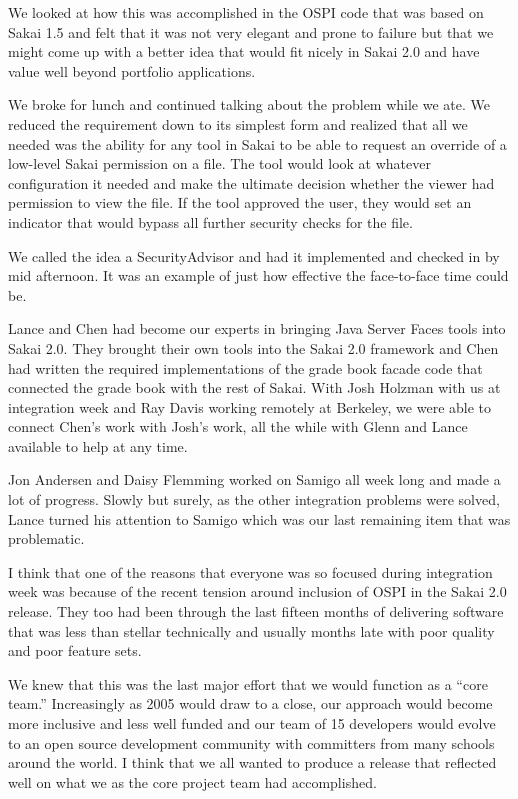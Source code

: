 \documentclass[12pt]{book}
\begin{document}
We looked at how this was accomplished in the OSPI code that
was based on Sakai 1.5 and felt that it was not very elegant
and prone to failure but that we might come up with a better
idea that would fit nicely in Sakai 2.0 and have value well
beyond portfolio applications.

We broke for lunch and continued talking about the problem
while we ate.  We reduced the requirement down to its simplest
form and realized that all we needed was the ability for any
tool in Sakai to be able to request an override
of a low-level Sakai permission on a file.  The tool would
look at whatever configuration it needed and make the
ultimate decision whether the viewer had permission to view
the file.   If the tool approved the user, they would set
an indicator that would bypass all further security checks
for the file.


We called the idea a SecurityAdvisor and had it
implemented and checked in by mid afternoon.  It was an
example of just how effective the face-to-face time could be.

Lance and Chen had become our experts in bringing Java
Server Faces tools into Sakai 2.0.   They brought their own tools
into the Sakai 2.0 framework and Chen had written the
required implementations of the grade book facade code that
connected the grade book with the rest of Sakai.
With Josh Holzman with us at integration week and Ray Davis
working remotely at Berkeley, we were able to connect
Chen's work with Josh's work, all the while with Glenn
and Lance available to help at any time.

Jon Andersen and Daisy Flemming worked on Samigo all week
long and made a lot of progress.  Slowly but surely, as the
other integration problems were solved, Lance turned his
attention to Samigo which was our last remaining item that
was problematic.

I think that one of the reasons that everyone was so
focused during integration week was because of
the recent tension around inclusion of OSPI in the
Sakai 2.0 release.
They too had been through the last fifteen months of
delivering software that was less than stellar technically
and usually months late with poor quality and poor feature
sets.

We knew that this was the last major effort that we would
function as a ``core team.''   Increasingly as 2005 would draw
to a close, our approach would become more inclusive and
less well funded and our team of 15 developers would evolve
to an open source development community with committers
from many schools around the world.  I think that we all
wanted to produce a release that reflected well on what we
as the core project team had accomplished.
\end{document}

